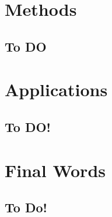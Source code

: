 \documentclass[
]{book}
\begin{document}
\hypertarget{methods}{%
\chapter{Methods}\label{methods}}

\hypertarget{to-do-1}{%
\section{To DO}\label{to-do-1}}

\hypertarget{applications}{%
\chapter{Applications}\label{applications}}

\hypertarget{to-do-2}{%
\section{To DO!}\label{to-do-2}}

\hypertarget{final-words}{%
\chapter{Final Words}\label{final-words}}

\hypertarget{to-do-3}{%
\section{To Do!}\label{to-do-3}}

  
\end{document}
